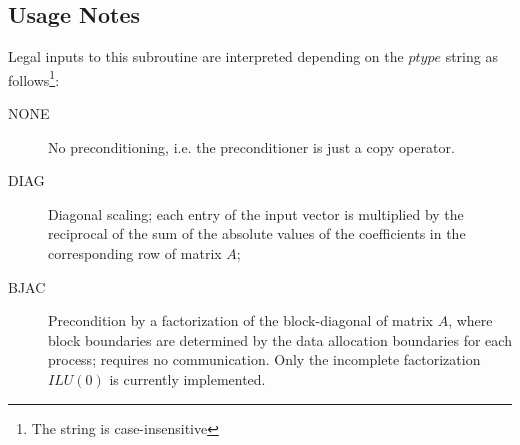 \subsection*{Usage Notes}
Legal inputs to this subroutine are interpreted depending on the
$ptype$ string as follows\footnote{The string is case-insensitive}:
\begin{description}
\item[NONE] No preconditioning, i.e. the preconditioner is just a copy
  operator.
\item[DIAG] Diagonal scaling; each entry of the input vector is
  multiplied by the reciprocal of the sum of the absolute values of
  the coefficients in the corresponding row of matrix  $A$;
\item[BJAC] Precondition by a  factorization of the
  block-diagonal of matrix $A$, where block boundaries are determined
  by the data allocation boundaries for each process; requires no
  communication. Only the incomplete factorization $ILU(0)$ is
  currently implemented.  

\end{description}
